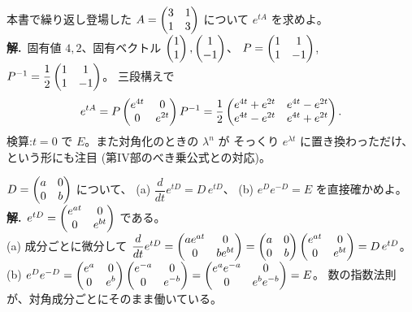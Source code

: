 \begin{rei}[例題・基本(対角化経由)]\label{rei:exp-diag}
本書で繰り返し登場した $A = \begin{pmatrix}3 & 1 \\ 1 & 3\end{pmatrix}$ について
$e^{tA}$ を求めよ。\\
\textbf{解.}\ 固有値 $4, 2$、固有ベクトル $\begin{pmatrix}1 \\ 1\end{pmatrix}, \begin{pmatrix}1 \\ -1\end{pmatrix}$、
$P = \begin{pmatrix}1 & 1 \\ 1 & -1\end{pmatrix}$, $P^{-1} = \dfrac{1}{2}\begin{pmatrix}1 & 1 \\ 1 & -1\end{pmatrix}$。
三段構えで
\[
e^{tA} = P\begin{pmatrix}e^{4t} & 0 \\ 0 & e^{2t}\end{pmatrix}P^{-1}
= \frac{1}{2}\begin{pmatrix}e^{4t} + e^{2t} & e^{4t} - e^{2t} \\
e^{4t} - e^{2t} & e^{4t} + e^{2t}\end{pmatrix}.
\]
検算:$t = 0$ で $E$。また対角化のときの $\lambda^n$ が
そっくり $e^{\lambda t}$ に置き換わっただけ、という形にも注目
(第IV部のべき乗公式との対応)。
\end{rei}

\begin{rei}[例題・基本(性質の確認)]\label{rei:exp-props}
$D = \begin{pmatrix}a & 0 \\ 0 & b\end{pmatrix}$ について、
(a) $\dfrac{d}{dt}e^{tD} = D\,e^{tD}$、
(b) $e^{D}e^{-D} = E$ を直接確かめよ。\\
\textbf{解.}\ $e^{tD} = \begin{pmatrix}e^{at} & 0 \\ 0 & e^{bt}\end{pmatrix}$ である。\\
(a) 成分ごとに微分して
$\dfrac{d}{dt}e^{tD} = \begin{pmatrix}ae^{at} & 0 \\ 0 & be^{bt}\end{pmatrix}
= \begin{pmatrix}a & 0 \\ 0 & b\end{pmatrix}\begin{pmatrix}e^{at} & 0 \\ 0 & e^{bt}\end{pmatrix} = D\,e^{tD}$。\\
(b) $e^{D}e^{-D} = \begin{pmatrix}e^a & 0 \\ 0 & e^b\end{pmatrix}\begin{pmatrix}e^{-a} & 0 \\ 0 & e^{-b}\end{pmatrix}
= \begin{pmatrix}e^a e^{-a} & 0 \\ 0 & e^b e^{-b}\end{pmatrix} = E$。
数の指数法則が、対角成分ごとにそのまま働いている。
\end{rei}

